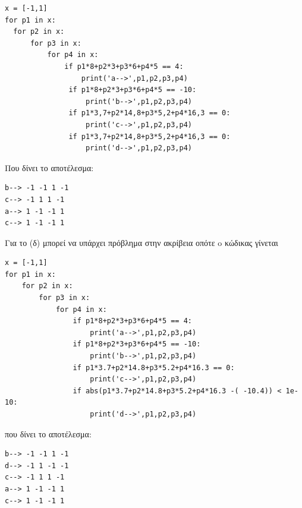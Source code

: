  \begin{lstlisting}
x = [-1,1]
for p1 in x:
  for p2 in x:
      for p3 in x:
          for p4 in x:
              if p1*8+p2*3+p3*6+p4*5 == 4:
                  print('a-->',p1,p2,p3,p4)
               if p1*8+p2*3+p3*6+p4*5 == -10:
                   print('b-->',p1,p2,p3,p4)
               if p1*3,7+p2*14,8+p3*5,2+p4*16,3 == 0:
                   print('c-->',p1,p2,p3,p4)
               if p1*3,7+p2*14,8+p3*5,2+p4*16,3 == 0:
                   print('d-->',p1,p2,p3,p4)
\end{lstlisting}
Που δίνει το αποτέλεσμα:
\begin{lstlisting}
b--> -1 -1 1 -1
c--> -1 1 1 -1
a--> 1 -1 -1 1
c--> 1 -1 -1 1
\end{lstlisting}
Για το (δ) μπορεί να υπάρχει πρόβλημα στην ακρίβεια οπότε o κώδικας γίνεται 
\begin{lstlisting}
x = [-1,1]
for p1 in x:
    for p2 in x:
        for p3 in x:
            for p4 in x:
                if p1*8+p2*3+p3*6+p4*5 == 4:
                    print('a-->',p1,p2,p3,p4)
                if p1*8+p2*3+p3*6+p4*5 == -10:
                    print('b-->',p1,p2,p3,p4)
                if p1*3.7+p2*14.8+p3*5.2+p4*16.3 == 0:
                    print('c-->',p1,p2,p3,p4)
                if abs(p1*3.7+p2*14.8+p3*5.2+p4*16.3 -( -10.4)) < 1e-10:
                    print('d-->',p1,p2,p3,p4)
\end{lstlisting}
που δίνει το αποτέλεσμα:
\begin{lstlisting}
b--> -1 -1 1 -1
d--> -1 1 -1 -1
c--> -1 1 1 -1
a--> 1 -1 -1 1
c--> 1 -1 -1 1
\end{lstlisting}

